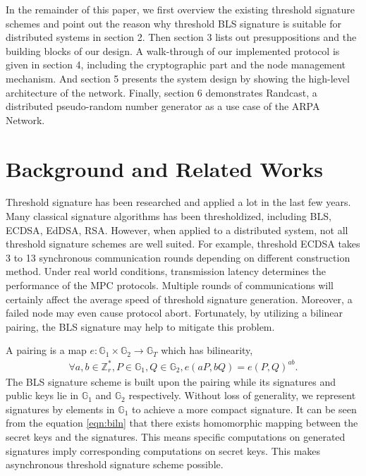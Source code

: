 \documentclass[11pt]{article}
\begin{document}
In the remainder of this paper, we first overview the existing threshold signature schemes and point out the reason why threshold BLS signature is suitable for distributed systems in section 2. Then section 3 lists out presuppositions and the building blocks of our design. A walk-through of our implemented protocol is given in section 4, including the cryptographic part and the node management mechanism. And section 5 presents the system design by showing the high-level architecture of the network. Finally, section 6 demonstrates Randcast, a distributed pseudo-random number generator as a use case of the ARPA Network.

\section{Background and Related Works}

Threshold signature has been researched and applied a lot in the last few years. Many classical signature algorithms has been thresholdized, including BLS, ECDSA\cite{gennaro2018fast}, EdDSA\cite{stinson2001provably}, RSA\cite{damgaard2001practical}. However, when applied to a distributed system, not all threshold signature schemes are well suited. For example, threshold ECDSA takes 3 to 13 synchronous communication rounds depending on different construction method\cite{aumasson2020survey}. Under real world conditions, transmission latency determines the performance of the MPC protocols. Multiple rounds of communications will certainly 
affect the average speed of threshold signature generation. Moreover, a failed node may even cause protocol abort. Fortunately, by utilizing a bilinear pairing, the BLS signature may help to mitigate this problem.

A pairing is a map $e:\mathbb{G}_1 \times \mathbb{G}_2 \to \mathbb{G}_T$ which has bilinearity, 
\begin{align}\label{eqn:biln}
    \forall a,b \in \mathbb{Z}_r^*, P \in \mathbb{G}_1, Q \in \mathbb{G}_2, e(aP,bQ)=e(P,Q)^{ab}.
\end{align}
The BLS signature scheme is built upon the pairing while its signatures and public keys lie in $\mathbb{G}_1$ and $\mathbb{G}_2$ respectively. Without loss of generality, we represent signatures by elements in $\mathbb{G}_1$ to achieve a more compact signature. It can be seen from the equation \ref{eqn:biln} that there exists homomorphic mapping between the secret keys and the signatures. This means specific computations on generated signatures imply corresponding computations on secret keys. This makes asynchronous threshold signature scheme possible.
\end{document}

